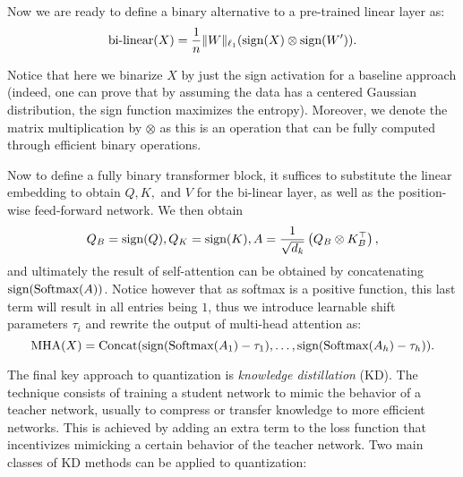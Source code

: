 Now we are ready to define a binary alternative to a pre-trained linear layer as:
\begin{equation}
    \text{bi-linear}(X) = \frac{1}{n}\|W\|_{\ell_1} (\text{sign}(X) \otimes \text{sign}(W')).
\end{equation}

Notice that here we binarize $X$ by just the sign activation for a baseline approach (indeed, one can prove that by assuming the data has a centered Gaussian distribution, the sign function maximizes the entropy). Moreover, we denote the matrix multiplication by $\otimes$ as this is an operation that can be fully computed through efficient binary operations.

\vspace{1em}

Now to define a fully binary transformer block, it suffices to substitute the linear embedding to obtain $Q, K,$ and $V$ for the bi-linear layer, as well as the position-wise feed-forward network. We then obtain 
\begin{equation}
   Q_B = \text{sign}(Q), Q_K = \text{sign}(K), A = \frac{1}{\sqrt{d_k}}\left( Q_B \otimes K_B^\top \right), 
\end{equation}
and ultimately the result of self-attention can be obtained by concatenating $\text{sign}(\text{Softmax}(A))$. Notice however that as softmax is a positive function, this last term will result in all entries being $1$, thus we introduce learnable shift parameters $\tau_i$ and rewrite the output of multi-head attention as:
\begin{equation}
    \text{MHA}(X) = \text{Concat}(\text{sign}(\text{Softmax}(A_1) - \tau_1), \ldots, \text{sign}(\text{Softmax}(A_h) - \tau_h)).
\end{equation}


\vspace{1em}

The final key approach to quantization is \textit{knowledge distillation} (KD)\cite{hinton2015distilling}. The technique consists of training a student network to mimic the behavior of a teacher network, usually to compress or transfer knowledge to more efficient networks. This is achieved by adding an extra term to the loss function that incentivizes mimicking a certain behavior of the teacher network. Two main classes of KD methods can be applied to quantization:

